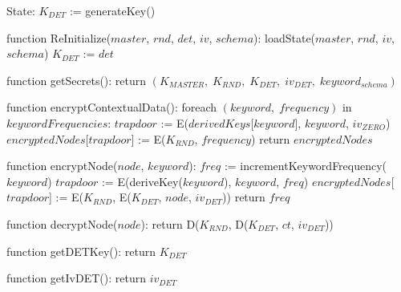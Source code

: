 State:
    $K_{DET}$ := generateKey()

function ReInitialize($master$, $rnd$, $det$, $iv$, $schema$):
    loadState($master$, $rnd$, $iv$, $schema$)
    $K_{DET}$ := $det$

function getSecrets():
    return $(K_{MASTER}, \; K_{RND}, \; K_{DET}, \; iv_{DET}, \; keyword_{schema})$

function encryptContextualData():
    foreach $(keyword, \; frequency)$ in $keywordFrequencies$:
        $trapdoor$ := E($derivedKeys$[$keyword$], $keyword$, $iv_{ZERO}$)
        $encryptedNodes$[$trapdoor$] := E($K_{RND}$, $frequency$)
    return $encryptedNodes$

function encryptNode($node$, $keyword$):
    $freq$ := incrementKeywordFrequency($keyword$)
    $trapdoor$ := E(deriveKey($keyword$), $keyword$, $freq$)
    $encryptedNodes$[$trapdoor$] := E($K_{RND}$, E($K_{DET}$, $node$, $iv_{DET}$))
    return $freq$
 
function decryptNode($node$):
    return D($K_{RND}$, D($K_{DET}$, $ct$, $iv_{DET}$))

function getDETKey():
    return $K_{DET}$

function getIvDET():
    return $iv_{DET}$